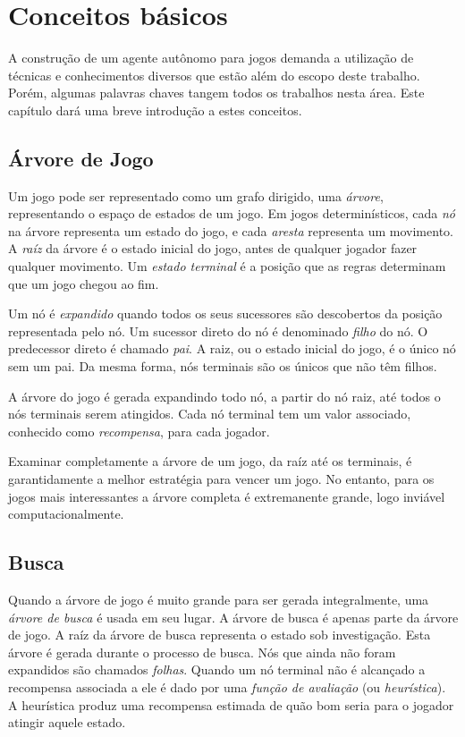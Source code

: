 \chapter{Conceitos básicos}
\label{concepts}
A construção de um agente autônomo para jogos demanda a utilização de técnicas e conhecimentos diversos que estão além do escopo deste trabalho. Porém, algumas palavras chaves tangem todos os trabalhos nesta área. Este capítulo dará uma breve introdução a estes conceitos.

\section{Árvore de Jogo}
Um jogo pode ser representado como um grafo dirigido, uma \textit{árvore}, representando o espaço de estados de um jogo. Em jogos determinísticos, cada \textit{nó} na árvore representa um estado do jogo, e cada \textit{aresta} representa um movimento. A \textit{raíz} da árvore é o estado inicial do jogo, antes de qualquer jogador fazer qualquer movimento. Um \textit{estado terminal} é a posição que as regras determinam que um jogo chegou ao fim. 

Um nó é \textit{expandido} quando todos os seus sucessores são descobertos da posição representada pelo nó. Um sucessor direto do nó é denominado \textit{filho} do nó. O predecessor direto é chamado \textit{pai}. A raiz, ou o estado inicial do jogo, é o único nó sem um pai. Da mesma forma, nós terminais são os únicos que não têm filhos.

A árvore do jogo é gerada expandindo todo nó, a partir do nó raiz, até todos o nós terminais serem atingidos. Cada nó terminal tem um valor associado, conhecido como \textit{recompensa}, para cada jogador. 

Examinar completamente a árvore de um jogo, da raíz até os terminais, é garantidamente a melhor estratégia para vencer um jogo. No entanto, para os jogos mais interessantes a árvore completa é extremanente grande, logo inviável computacionalmente. 

\section{Busca}
Quando a árvore de jogo é muito grande para ser gerada integralmente, uma \textit{árvore de busca} é usada em seu lugar. A árvore de busca é apenas parte da árvore de jogo. A raíz da árvore de busca representa o estado sob investigação. Esta árvore é gerada durante o processo de busca. Nós que ainda não foram expandidos são chamados \textit{folhas}. Quando um nó terminal não é alcançado a recompensa associada a ele é dado por uma \textit{função de avaliação} (ou \textit{heurística}). A heurística produz uma recompensa estimada de quão bom seria para o jogador atingir aquele estado.